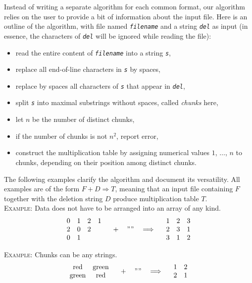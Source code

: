 \documentclass[a4paper,11pt]{report}
\begin{document}
{{Instead of writing a separate algorithm for each common format, our algorithm
relies on the user to provide a bit of information about the input file. Here
is an outline of the algorithm, with file named \mbox{\texttt{\mdseries\slshape filename}} and a string \mbox{\texttt{\mdseries\slshape del}} as input (in essence, the characters of \mbox{\texttt{\mdseries\slshape del}} will be ignored while reading the file): 
\begin{itemize}
\item read the entire content of \mbox{\texttt{\mdseries\slshape filename}} into a string \mbox{\texttt{\mdseries\slshape s}},
\item replace all end-of-line characters in \mbox{\texttt{\mdseries\slshape s}} by spaces,
\item replace by spaces all characters of \mbox{\texttt{\mdseries\slshape s}} that appear in \mbox{\texttt{\mdseries\slshape del}},
\item split \mbox{\texttt{\mdseries\slshape s}} into maximal substrings without spaces, called \emph{chunks} here,
\item let $n$ be the number of distinct chunks,
\item if the number of chunks is not $n^2$, report error,
\item construct the multiplication table by assigning numerical values $1$, $\dots$, $n$ to chunks, depending on their position among distinct chunks.
\end{itemize}
 

The following examples clarify the algorithm and document its versatility. All
examples are of the form $F+D\Longrightarrow T$, meaning that an input file containing $F$ together with the deletion string $D$ produce multiplication table $T$. \\


\textsc{Example:} Data does not have to be arranged into an array of any kind. 
\[ \begin{array}{cccc} 0&1&2&1\\ 2&0&2& \\ 0&1& & \end{array}\quad + \quad ""
\quad \Longrightarrow\quad \begin{array}{ccc} 1&2&3\\ 2&3&1\\ 3&1&2
\end{array} \]
 

\textsc{Example:} Chunks can be any strings. 
\[ \begin{array}{cc} {\rm red}&{\rm green}\\ {\rm green}&{\rm red}\\
\end{array}\quad + \quad "" \quad \Longrightarrow\quad \begin{array}{cc} 1&
2\\ 2& 1 \end{array} \]
 

}}
\end{document}
